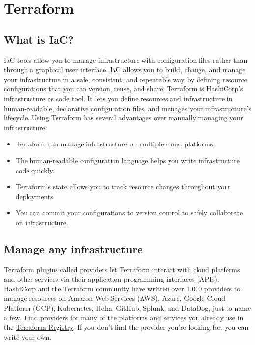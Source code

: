 \documentclass[../main.tex]{subfiles}
\begin{document}
\chapter{Terraform}
\section{What is IaC?}
\gls{IaC} tools allow you to manage infrastructure with configuration files rather than through a graphical user interface.
IaC allows you to build, change, and manage your infrastructure in a safe, consistent, and repeatable way by defining resource configurations that you can version, reuse, and share.
Terraform is HashiCorp's infrastructure as code tool.
It lets you define resources and infrastructure in human-readable, declarative configuration files, and manages your infrastructure's lifecycle.
Using Terraform has several advantages over manually managing your infrastructure:
\begin{itemize}
  \item{Terraform can manage infrastructure on multiple cloud platforms.}
  \item{The human-readable configuration language helps you write infrastructure code quickly.}
  \item{Terraform's state allows you to track resource changes throughout your deployments.}
  \item{You can commit your configurations to version control to safely collaborate on infrastructure.}
\end{itemize}

\section{Manage any infrastructure}
Terraform plugins called providers let Terraform interact with cloud platforms and other services via their application programming interfaces (APIs).
HashiCorp and the Terraform community have written over 1,000 providers to manage resources on Amazon Web Services (AWS), Azure, Google Cloud Platform (GCP), Kubernetes, Helm, GitHub, Splunk, and DataDog, just to name a few.
Find providers for many of the platforms and services you already use in the \href{https://registry.terraform.io/browse/providers}{Terraform Registry}.
If you don't find the provider you're looking for, you can write your own.
\end{document}
